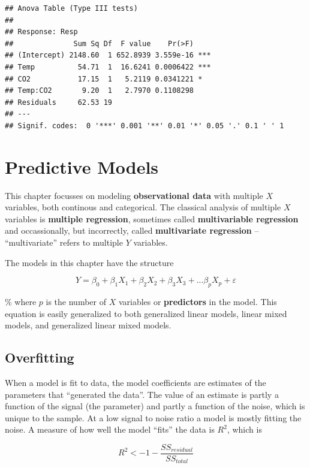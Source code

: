 \documentclass[]{book}
\begin{document}
\begin{verbatim}
## Anova Table (Type III tests)
## 
## Response: Resp
##              Sum Sq Df  F value    Pr(>F)    
## (Intercept) 2148.60  1 652.8939 3.559e-16 ***
## Temp          54.71  1  16.6241 0.0006422 ***
## CO2           17.15  1   5.2119 0.0341221 *  
## Temp:CO2       9.20  1   2.7970 0.1108298    
## Residuals     62.53 19                       
## ---
## Signif. codes:  0 '***' 0.001 '**' 0.01 '*' 0.05 '.' 0.1 ' ' 1
\end{verbatim}

\chapter{Predictive Models}\label{predictive-models}

This chapter focusses on modeling \textbf{observational data} with
multiple \(X\) variables, both continous and categorical. The classical
analysis of multiple \(X\) variables is \textbf{multiple regression},
sometimes called \textbf{multivariable regression} and occassionally,
but incorrectly, called \textbf{multivariate regression} --
``multivariate'' refers to multiple \(Y\) variables.

The models in this chapter have the structure

\begin{equation}
Y = \beta_0 + \beta_1 X_1 + \beta_2 X_2 + \beta_3 X_3 + ... \beta_p X_p + \varepsilon 
\end{equation}

\% where \(p\) is the number of \(X\) variables or \textbf{predictors}
in the model. This equation is easily generalized to both generalized
linear models, linear mixed models, and generalized linear mixed models.

\section{Overfitting}\label{overfitting}

When a model is fit to data, the model coefficients are estimates of the
parameters that ``generated the data''. The value of an estimate is
partly a function of the signal (the parameter) and partly a function of
the noise, which is unique to the sample. At a low signal to noise ratio
a model is mostly fitting the noise. A measure of how well the model
``fits'' the data is \(R^2\), which is

\begin{equation}
R^2 <- 1 - \frac{SS_{residual}}{SS_{total}}
\end{equation}
\end{document}
